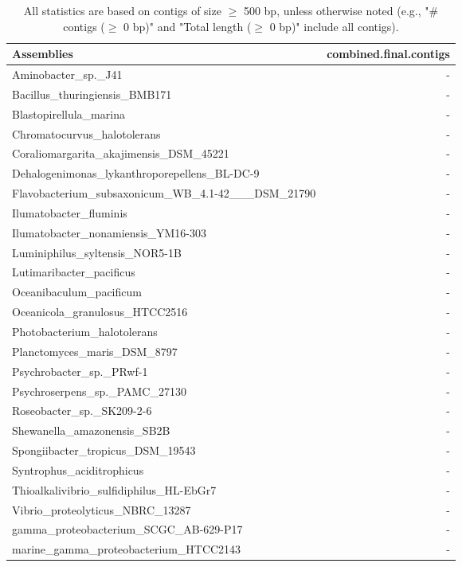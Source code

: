 \documentclass[12pt,a4paper]{article}
\begin{document}
\begin{table}[ht]
\begin{center}
\caption{All statistics are based on contigs of size $\geq$ 500 bp, unless otherwise noted (e.g., "\# contigs ($\geq$ 0 bp)" and "Total length ($\geq$ 0 bp)" include all contigs).}
\begin{tabular}{|l*{1}{|r}|}
\hline
Assemblies & combined.final.contigs \\ \hline
Aminobacter\_sp.\_J41 & - \\ \hline
Bacillus\_thuringiensis\_BMB171 & - \\ \hline
Blastopirellula\_marina & - \\ \hline
Chromatocurvus\_halotolerans & - \\ \hline
Coraliomargarita\_akajimensis\_DSM\_45221 & - \\ \hline
Dehalogenimonas\_lykanthroporepellens\_BL-DC-9 & - \\ \hline
Flavobacterium\_subsaxonicum\_WB\_4.1-42\_\_\_DSM\_21790 & - \\ \hline
Ilumatobacter\_fluminis & - \\ \hline
Ilumatobacter\_nonamiensis\_YM16-303 & - \\ \hline
Luminiphilus\_syltensis\_NOR5-1B & - \\ \hline
Lutimaribacter\_pacificus & - \\ \hline
Oceanibaculum\_pacificum & - \\ \hline
Oceanicola\_granulosus\_HTCC2516 & - \\ \hline
Photobacterium\_halotolerans & - \\ \hline
Planctomyces\_maris\_DSM\_8797 & - \\ \hline
Psychrobacter\_sp.\_PRwf-1 & - \\ \hline
Psychroserpens\_sp.\_PAMC\_27130 & - \\ \hline
Roseobacter\_sp.\_SK209-2-6 & - \\ \hline
Shewanella\_amazonensis\_SB2B & - \\ \hline
Spongiibacter\_tropicus\_DSM\_19543 & - \\ \hline
Syntrophus\_aciditrophicus & - \\ \hline
Thioalkalivibrio\_sulfidiphilus\_HL-EbGr7 & - \\ \hline
Vibrio\_proteolyticus\_NBRC\_13287 & - \\ \hline
gamma\_proteobacterium\_SCGC\_AB-629-P17 & - \\ \hline
marine\_gamma\_proteobacterium\_HTCC2143 & - \\ \hline
\end{tabular}
\end{center}
\end{table}
\end{document}
